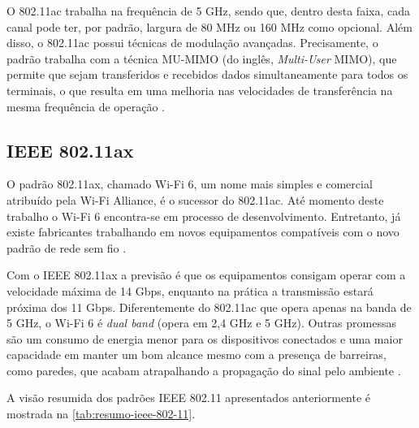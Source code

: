 O 802.11ac trabalha na frequência de 5 GHz, sendo que, dentro desta faixa, cada canal pode ter, por padrão, largura de 80 MHz ou 160 MHz como opcional. Além disso, o 802.11ac possui técnicas de modulação avançadas. Precisamente, o padrão trabalha com a técnica MU-MIMO (do inglês, \textit{Multi-User} MIMO), que permite que sejam transferidos e recebidos dados simultaneamente para todos os terminais, o que resulta em uma melhoria nas velocidades de transferência na mesma frequência de operação \cite{alecrim2008site}.

\subsection{IEEE 802.11ax}
\label{802-11ax}

O padrão 802.11ax, chamado Wi-Fi 6, um nome mais simples e comercial atribuído pela Wi-Fi Alliance, é o sucessor do 802.11ac. Até momento deste trabalho o Wi-Fi 6 encontra-se em processo de desenvolvimento. Entretanto, já existe fabricantes trabalhando em novos equipamentos compatíveis com o novo padrão de rede sem fio \cite{plaza2018site}.

Com o IEEE 802.11ax a previsão é que os equipamentos consigam operar com a velocidade máxima de 14 Gbps, enquanto na prática a transmissão estará próxima dos 11 Gbps. Diferentemente do 802.11ac que opera apenas na banda de 5 GHz, o Wi-Fi 6 é \textit{dual band} (opera em 2,4 GHz e 5 GHz). Outras promessas são um consumo de energia menor para os dispositivos conectados e uma maior capacidade em manter um bom alcance mesmo com a presença de barreiras, como paredes, que acabam atrapalhando a propagação do sinal pelo ambiente \cite{plaza2018site}.

A visão resumida dos padrões IEEE 802.11 apresentados anteriormente é mostrada na \autoref{tab:resumo-ieee-802-11}.

